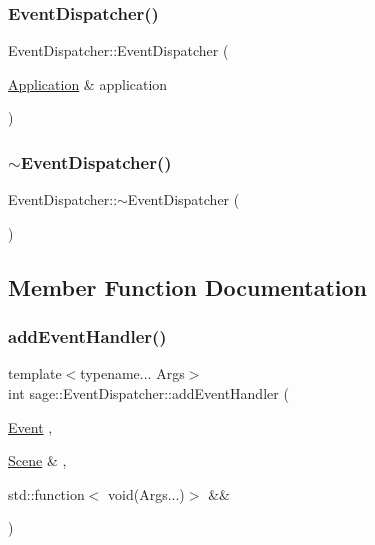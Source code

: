 \subsubsection{\texorpdfstring{EventDispatcher()}{EventDispatcher()}}
{\footnotesize\ttfamily Event\+Dispatcher\+::\+Event\+Dispatcher (\begin{DoxyParamCaption}\item[{\mbox{\hyperlink{classsage_1_1Application}{Application}} \&}]{application }\end{DoxyParamCaption})}

\mbox{\label{classsage_1_1EventDispatcher_abb5f401014e87f03027d6c4450964e55}} 
\subsubsection{\texorpdfstring{$\sim$EventDispatcher()}{~EventDispatcher()}}
{\footnotesize\ttfamily Event\+Dispatcher\+::$\sim$\+Event\+Dispatcher (\begin{DoxyParamCaption}{ }\end{DoxyParamCaption})}



\subsection{Member Function Documentation}
\mbox{\label{classsage_1_1EventDispatcher_aeea139ba4798b0dd9409ca8367b0727e}} 
\subsubsection{\texorpdfstring{addEventHandler()}{addEventHandler()}\hspace{0.1cm}{\footnotesize\ttfamily [1/3]}}
{\footnotesize\ttfamily template$<$typename... Args$>$ \\
int sage\+::\+Event\+Dispatcher\+::add\+Event\+Handler (\begin{DoxyParamCaption}\item[{\mbox{\hyperlink{namespacesage_afe706a25026cc74fe69b56d53a265d29}{Event}}}]{,  }\item[{\mbox{\hyperlink{classsage_1_1Scene}{Scene}} \&}]{,  }\item[{std\+::function$<$ void(Args...)$>$ \&\&}]{ }\end{DoxyParamCaption})}

